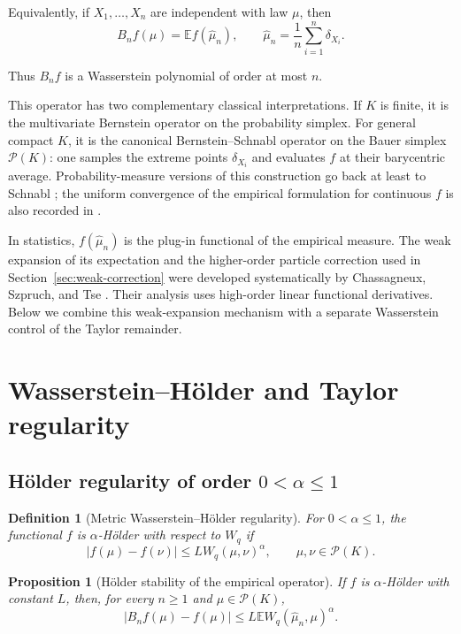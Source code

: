\documentclass[11pt]{article}
\newtheorem{definition}{Definition}
\newtheorem{proposition}{Proposition}
\newcommand{\Pcal}{\mathcal P}
\newcommand{\E}{\mathbb E}
\begin{document}
Equivalently, if \(X_1,\ldots,X_n\) are independent with law \(\mu\), then
\[
B_nf(\mu)=\E f(\widehat\mu_n),
\qquad
\widehat\mu_n=\frac1n\sum_{i=1}^n\delta_{X_i}.
\]

Thus \(B_nf\) is a Wasserstein polynomial of order at most \(n\).

This operator has two complementary classical interpretations. If \(K\) is
finite, it is the multivariate Bernstein operator on the probability
simplex. For general compact \(K\), it is the canonical
Bernstein--Schnabl operator on the Bauer simplex \(\Pcal(K)\): one samples
the extreme points \(\delta_{X_i}\) and evaluates \(f\) at their barycentric
average. Probability-measure versions of this construction go back at
least to Schnabl \cite{schnabl}; the uniform convergence of the empirical
formulation for continuous \(f\) is also recorded in \cite{babu}.

In statistics, \(f(\widehat\mu_n)\) is the plug-in functional of the
empirical measure. The weak expansion of its expectation and the
higher-order particle correction used in
Section~\ref{sec:weak-correction} were developed systematically by
Chassagneux, Szpruch, and Tse
\cite{chassagneux-szpruch-tse}. Their analysis uses high-order linear
functional derivatives. Below we combine this weak-expansion mechanism
with a separate Wasserstein control of the Taylor remainder.

\section{Wasserstein--Hölder and Taylor regularity}

\subsection{Hölder regularity of order \(0<\alpha\leq 1\)}
\label{sec:metric-holder}

\begin{definition}[Metric Wasserstein--Hölder regularity]
For \(0<\alpha\leq1\), the functional \(f\) is
\(\alpha\)-Hölder with respect to \(W_q\) if
\[
|f(\mu)-f(\nu)|
\leq L W_q(\mu,\nu)^\alpha,
\qquad
\mu,\nu\in\Pcal(K).
\]
\end{definition}

\begin{proposition}[Hölder stability of the empirical operator]
\label{prop:holder-stability}
If \(f\) is \(\alpha\)-Hölder with constant \(L\), then, for every
\(n\geq1\) and \(\mu\in\Pcal(K)\),
\[
|B_nf(\mu)-f(\mu)|
\leq
L\E W_q(\widehat\mu_n,\mu)^\alpha.
\]
\end{proposition}
\end{document}
